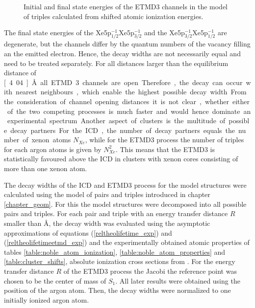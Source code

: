 \begin{figure}[htb]
 \centering
 
 \caption{Initial and final state energies of the \ac{ETMD}3 channels
          in the model of triples calculated from shifted atomic ionization
          energies.}
 \label{figure:ArXe_energy_etmd_curves}
\end{figure}

The final state energies of the Xe5p$_{1/2}^{-1}$Xe5p$_{3/2}^{-1}$ and
the Xe5p$_{3/2}^{-1}$Xe5p$_{1/2}^{-1}$ are degenerate, but the channels
differ by the quantum
numbers of the vacancy filling an the emitted electron. Hence, the decay
widths are not necessarily equal and need to be treated separately.
For all distances larger than the equilibrium distance of \unit[4.04]{\AA}
all \ac{ETMD}3 channels are open. Therefore, the decay can occur with
nearest neighbours, which enable the highest possible decay width.

From the consideration of channel opening distances it is not clear, whether
either of the two competing processes is much faster and would hence dominate
an experimental spectrum. Another aspect of clusters is the multitude of
possible decay partners. For the \ac{ICD}, the number of decay partners equals
the number of xenon atoms $N_{Xe}$, while for the \ac{ETMD}3 process the number
of triples for each argon atoms is given by $N_{Xe}^2$. This means that
the \ac{ETMD}3 is statistically favoured above the \ac{ICD} in clusters with
xenon cores consisting of more than one xenon atom.

The decay widths of the \ac{ICD} and \ac{ETMD}3 process for the model
structures were calculated using the model of pairs and triples introduced in
chapter \ref{chapter_geom}. For this the model structures were decomposed
into all possible pairs and triples. For each pair and triple with an energy
transfer distance $R$ smaller than \unit[11]{\AA}, the decay width was evaluated
using
the asymptotic approximations of equations
(\ref{reltheolifetime_exp}) and (\ref{reltheolifetimeetmd_exp}) and the
experimentally obtained atomic properties of tables
\ref{table:noble_atom_ionization}, \ref{table:noble_atom_properties} and
\ref{table:cluster_shifts}, absolute ionization cross sections from
\cite{West78}. For the energy transfer distance $R$ of the \ac{ETMD}3 process
the Jacobi the reference point was chosen to be the center of mass of
$S_1$. All later results were obtained using the position of the argon
atom.
Then, the decay widths were normalized to one initially ionized argon
atom.

